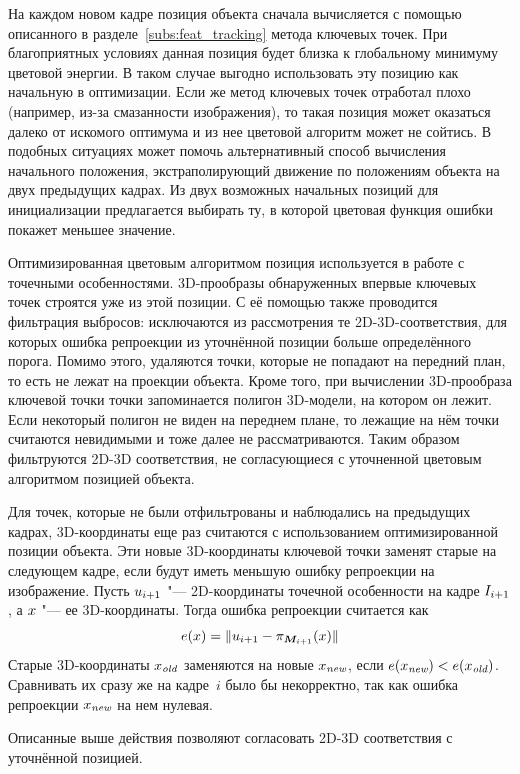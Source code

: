 На каждом новом кадре позиция объекта сначала вычисляется с помощью
описанного в разделе~\ref{subs:feat_tracking} метода ключевых точек.
При благоприятных условиях данная позиция будет близка к глобальному минимуму
цветовой энергии.
В таком случае выгодно использовать эту позицию как начальную в оптимизации.
Если же метод ключевых точек отработал плохо (например, из-за смазанности
изображения), то такая позиция может оказаться далеко от искомого оптимума и
из нее цветовой алгоритм может не сойтись.
В подобных ситуациях может помочь альтернативный способ вычисления начального
положения, экстраполирующий движение по положениям объекта на двух предыдущих
кадрах.
Из двух возможных начальных позиций для инициализации предлагается выбирать ту,
в которой цветовая функция ошибки покажет меньшее значение.

Оптимизированная цветовым алгоритмом позиция используется в работе с точечными
особенностями.
3D-прообразы обнаруженных впервые ключевых точек строятся уже из этой позиции.
С её помощью также проводится фильтрация выбросов: исключаются из рассмотрения те 2D-3D-соответствия, для
которых ошибка репроекции из уточнённой позиции больше определённого порога.
Помимо этого, удаляются точки, которые не попадают на передний план, то есть не
лежат на проекции объекта.
Кроме того, при вычислении 3D-прообраза ключевой точки точки запоминается
полигон 3D-модели, на котором он лежит.
Если некоторый полигон не виден на переднем плане, то лежащие на нём точки
считаются невидимыми и тоже далее не рассматриваются.
Таким образом фильтруются 2D-3D соответствия, не согласующиеся с уточненной
цветовым алгоритмом позицией объекта.

Для точек, которые не были отфильтрованы и наблюдались на предыдущих кадрах, 3D-координаты еще раз считаются с
использованием оптимизированной позиции объекта.
Эти новые 3D-координаты ключевой точки заменят старые на следующем кадре, если
будут иметь меньшую ошибку репроекции на изображение.
Пусть $\mathnormal{u}_{i + 1}$ "--- 2D-координаты точечной особенности на кадре
$I_{i + 1}$, а $\mathnormal{x}$ "--- ее 3D-координаты.
Тогда ошибка репроекции считается как
\begin{equation}\label{eqn:err_reproj}
    \mathnormal{e}( \mathnormal{x} ) = \| \mathnormal{u}_{i + 1} - \pi_{\bm{M}_{i + 1}}(\mathnormal{x}) \|
\end{equation}
Старые 3D-координаты $\mathnormal{x}_{\text {\it old}}$ заменяются на новые $\mathnormal{x}_{\text{\it new}}$, если
$\mathnormal{e}( \mathnormal{x}_{\text{\it new}} ) < \mathnormal{e}( \mathnormal{x}_{\text {\it old}} )$.
Сравнивать их сразу же на кадре~$i$ было бы некорректно, так как ошибка
репроекции $\mathnormal{x}_{\text{\it new}}$ на нем нулевая.

Описанные выше действия позволяют согласовать 2D-3D соответствия с уточнённой позицией.

